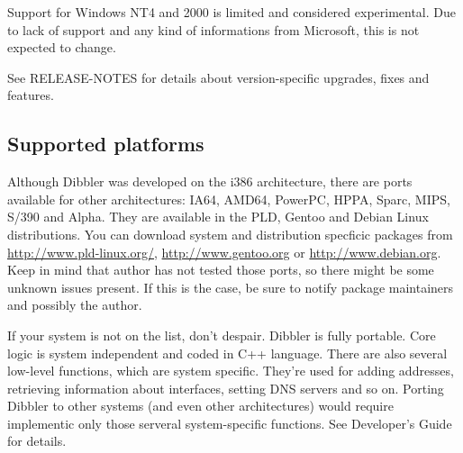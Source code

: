 Support for Windows NT4 and 2000 is limited and considered
experimental. Due to lack of support and any kind of informations from
Microsoft, this is not expected to change.

See RELEASE-NOTES for details about version-specific upgrades, fixes
and features.

\subsection{Supported platforms}
Although Dibbler was developed on the i386 architecture, there
are ports available for other architectures: IA64, AMD64, PowerPC,
HPPA, Sparc, MIPS, S/390 and Alpha. They are available in the PLD,
Gentoo and Debian Linux distributions. You can download system and
distribution specficic packages from \url{http://www.pld-linux.org/},
\url{http://www.gentoo.org} or \url{http://www.debian.org}. Keep in mind
that author has not tested those ports, so there might be some
unknown issues present. If this is the case, be sure to notify package
maintainers and possibly the author. 

If your system is not on the list, don't despair. Dibbler is fully
portable. Core logic is system independent and coded in C++
language. There are also several low-level functions, which are system
specific. They're used for adding addresses, retrieving information about
interfaces, setting DNS servers and so on. Porting Dibbler to other
systems (and even other architectures) would require implementic only
those serveral system-specific functions. See Developer's Guide for
details.
